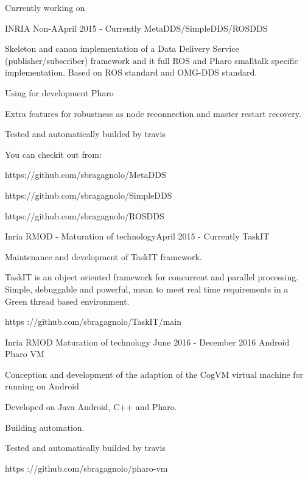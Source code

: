 \documentclass{resume} %
\begin{document}
\begin{rSection}{Currently working on}
	\begin{rSubsection}{INRIA Non-A}{April 2015 - Currently }{MetaDDS/SimpleDDS/ROSDDS}
			\item Skeleton and canon implementation of a Data Delivery Service (publisher/subscriber) framework and it full ROS and Pharo smalltalk specific implementation. Based on ROS standard and OMG-DDS standard.
			\item Using for development Pharo
			\item Extra features for robustness as node reconnection and master restart recovery. 
			\item Tested and automatically builded by travis
			\item You can checkit out from: 
			\item https://github.com/sbragagnolo/MetaDDS
			\item https://github.com/sbragagnolo/SimpleDDS
			\item https://github.com/sbragagnolo/ROSDDS
	\end{rSubsection}

	\begin{rSubsection}{Inria RMOD - Maturation of technology}{April 2015 - Currently }{TaskIT}
		\item 	
		\item Maintenance and development of TaskIT framework. 
		\item TaskIT is an object oriented framework for concurrent and parallel processing. Simple, debuggable and powerful, mean to meet real time requirements in a Green thread based environment.
		\item  https ://github.com/sbragagnolo/TaskIT/main
	\end{rSubsection}
	

	\begin{rSubsection}{Inria RMOD  Maturation of technology }{June 2016 - December 2016 }{Android Pharo VM}
		\item		
		\item Conception and development of the adaption of the CogVM virtual machine for running on Android 
		\item Developed on Java Android, C++ and Pharo.
		\item Building automation.
		\item Tested and automatically builded by travis
 		\item https ://github.com/sbragagnolo/pharo-vm	
	\end{rSubsection}



\end{rSection}
\end{document}
